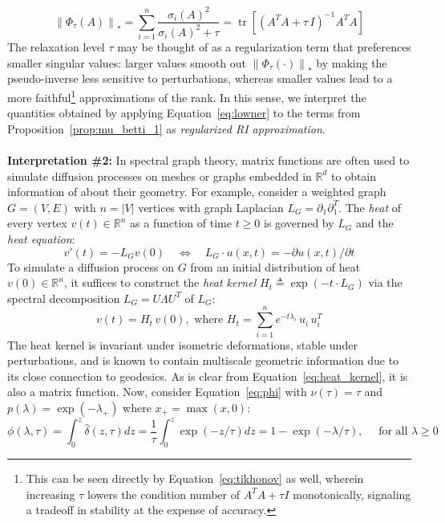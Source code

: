 \documentclass[pdflatex,sn-mathphys-num]{sn-jnl}
\begin{document}
\[\label{eq:tikhonov_1}
\left\| {\Phi_{\tau}(A)} \right\|_{\ast} = \sum_{i = 1}^{n}\frac{\sigma_{i}(A)^{2}}{\sigma_{i}(A)^{2} + \tau} = \operatorname{tr} \left[  \left( A^{T}A + \tau\, I \right) ^{- 1}A^{T}A \right]
\]
The relaxation level \(\tau\) may be thought of as a regularization term that preferences smaller singular values: larger values smooth out \(\left\| {\Phi_{\tau} ( \cdot ) } \right\|_{\ast}\) by making the pseudo-inverse less sensitive to perturbations, whereas smaller values lead to a more faithful\footnote{This can be seen directly by Equation~\ref{eq:tikhonov} as well, wherein increasing \(\tau\) lowers the condition number of \(A^{T}A + \tau I\) monotonically, signaling a tradeoff in stability at the expense of accuracy.} approximations of the rank. In this sense, we interpret the quantities obtained by applying Equation~\ref{eq:lowner} to the terms from Proposition~\ref{prop:mu_betti_1} as \emph{regularized RI approximation}.
\\
\\
\noindent \textbf{Interpretation \#2:} In spectral graph theory, matrix functions are often used to simulate diffusion processes on meshes or graphs embedded in \(\mathbb{R}^{d}\) to obtain information of about their geometry. For example, consider a weighted graph \(G = (V,E)\) with \(n = |V|\) vertices with graph Laplacian \(L_{G} = \partial_{1}\partial_{1}^{T}\). The \emph{heat} of every vertex \(v(t) \in \mathbb{R}^{n}\) as a function of time \(t \geq 0\) is governed by \(L_{G}\) and the \emph{heat equation}:
\[\label{eq:heat_eq}
v'(t) = - L_{G}v(0)\quad \Leftrightarrow \quad L_{G} \cdot u(x,t) = - \partial u(x,t)/\partial t
\]
To simulate a diffusion process on \(G\) from an initial distribution of heat \(v(0) \in \mathbb{R}^{n}\), it suffices to construct the \emph{heat kernel} \(H_{t} \triangleq \exp \left( - t \cdot L_{G} \right) \) via the spectral decomposition \(L_{G} = U\Lambda U^{T}\) of \(L_{G}\):
\[\label{eq:heat_kernel}
v(t) = H_{t}\, v(0),\text{ where }H_{t} = \sum_{i = 1}^{n}e^{- t\lambda_{i}}\, u_{i}\, u_{i}^{T}
\]
The heat kernel is invariant under isometric deformations, stable under perturbations, and is known to contain multiscale geometric information due to its close connection to geodesics. As is clear from Equation~\ref{eq:heat_kernel}, it is also a matrix function. Now, consider Equation~\ref{eq:phi} with \(\nu(\tau) = \tau\) and \(p(\lambda) = \exp\left( - \lambda_{+} \right)\) where \(x_{+} = \max(x,0)\):
\[\label{eq:heat_sf}
\phi(\lambda,\tau) = \int_{0}^{z}\hat{\delta}(z,\tau)dz = \frac{1}{\tau}\int_{0}^{z}\exp( - z/\tau)dz = 1 - \exp( - \lambda/\tau),\quad\text{ for all }\lambda \geq 0
\]
\end{document}
